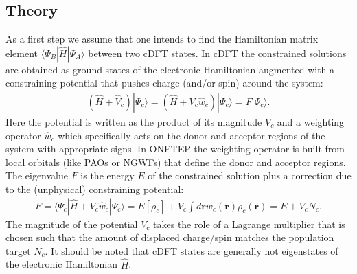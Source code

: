 \documentclass[letterpaper,10pt,english]{sphinxmanual}
\begin{document}
\subsection{Theory}
\label{\detokenize{ci:theory}}
As a first step we assume that one intends to find the Hamiltonian
matrix element \(\langle\Psi_{B}|\hat{H}|\Psi_{A}\rangle\) between
two cDFT states. In cDFT the constrained solutions are obtained as
ground states of the electronic Hamiltonian augmented with a
constraining potential that pushes charge (and/or spin) around the
system:
\begin{equation*}
\begin{split}(\hat{H}+\hat{V}_{c})|\Psi_{c}\rangle=(\hat{H}+V_{c}\hat{w}_{c})|\Psi_{c}\rangle=F|\Psi_{c}\rangle.\end{split}
\end{equation*}
Here the potential is written as the product of its magnitude
\(V_{c}\) and a weighting operator \(\hat{w}_{c}\) which
specifically acts on the donor and acceptor regions of the system with
appropriate signs. In ONETEP the weighting operator is built from local
orbitals (like PAOs or NGWFs) that define the donor and acceptor
regions. The eigenvalue \(F\) is the energy \(E\) of the
constrained solution plus a correction due to the (unphysical)
constraining potential:
\begin{equation*}
\begin{split}F=\langle\Psi_{c}|\hat{H}+V_{c}\hat{w}_{c}|\Psi_{c}\rangle=E[\rho_{c}]+V_{c}\int d\mathbf{r}w_{c}(\mathbf{r})\rho_{c}(\mathbf{r})=E+V_{c}N_{c}.\end{split}
\end{equation*}
The magnitude of the potential \(V_{c}\) takes the role of a
Lagrange multiplier that is chosen such that the amount of displaced
charge/spin matches the population target \(N_{c}\). It should be
noted that cDFT states are generally not eigenstates of the electronic
Hamiltonian \(\hat{H}\).
\end{document}
